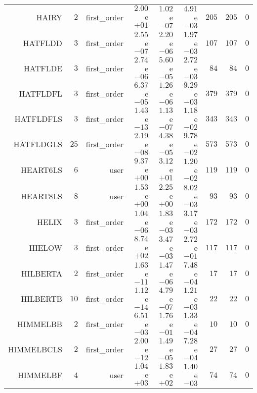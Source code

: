 \begin{longtable}{rrrrrrrrr}
HAIRY & \(     2\) & first\_order & \( 2.00\)e\(+01\) & \( 1.02\)e\(-07\) & \( 4.91\)e\(-03\) & \(   205\) & \(   205\) & \(     0\) \\
HATFLDD & \(     3\) & first\_order & \( 2.55\)e\(-07\) & \( 2.20\)e\(-06\) & \( 1.97\)e\(-03\) & \(   107\) & \(   107\) & \(     0\) \\
HATFLDE & \(     3\) & first\_order & \( 2.74\)e\(-06\) & \( 5.60\)e\(-05\) & \( 2.72\)e\(-03\) & \(    84\) & \(    84\) & \(     0\) \\
HATFLDFL & \(     3\) & first\_order & \( 6.37\)e\(-05\) & \( 1.26\)e\(-06\) & \( 9.29\)e\(-03\) & \(   379\) & \(   379\) & \(     0\) \\
HATFLDFLS & \(     3\) & first\_order & \( 1.43\)e\(-13\) & \( 1.13\)e\(-07\) & \( 1.18\)e\(-02\) & \(   343\) & \(   343\) & \(     0\) \\
HATFLDGLS & \(    25\) & first\_order & \( 2.19\)e\(-08\) & \( 4.38\)e\(-05\) & \( 9.78\)e\(-02\) & \(   573\) & \(   573\) & \(     0\) \\
HEART6LS & \(     6\) & user & \( 9.37\)e\(+00\) & \( 3.12\)e\(+01\) & \( 1.20\)e\(-02\) & \(   119\) & \(   119\) & \(     0\) \\
HEART8LS & \(     8\) & user & \( 1.53\)e\(+00\) & \( 2.25\)e\(+00\) & \( 8.02\)e\(-03\) & \(    93\) & \(    93\) & \(     0\) \\
HELIX & \(     3\) & first\_order & \( 1.04\)e\(-06\) & \( 1.83\)e\(-03\) & \( 3.17\)e\(-03\) & \(   172\) & \(   172\) & \(     0\) \\
HIELOW & \(     3\) & first\_order & \( 8.74\)e\(+02\) & \( 3.47\)e\(-03\) & \( 2.72\)e\(-01\) & \(   117\) & \(   117\) & \(     0\) \\
HILBERTA & \(     2\) & first\_order & \( 1.63\)e\(-11\) & \( 1.47\)e\(-06\) & \( 7.48\)e\(-04\) & \(    17\) & \(    17\) & \(     0\) \\
HILBERTB & \(    10\) & first\_order & \( 1.12\)e\(-14\) & \( 4.79\)e\(-07\) & \( 1.21\)e\(-03\) & \(    22\) & \(    22\) & \(     0\) \\
HIMMELBB & \(     2\) & first\_order & \( 6.51\)e\(-03\) & \( 1.76\)e\(-01\) & \( 1.33\)e\(-04\) & \(    10\) & \(    10\) & \(     0\) \\
HIMMELBCLS & \(     2\) & first\_order & \( 2.00\)e\(-12\) & \( 1.49\)e\(-05\) & \( 7.28\)e\(-04\) & \(    27\) & \(    27\) & \(     0\) \\
HIMMELBF & \(     4\) & user & \( 1.04\)e\(+03\) & \( 1.83\)e\(+02\) & \( 1.40\)e\(-03\) & \(    74\) & \(    74\) & \(     0\) \\

\end{longtable}
